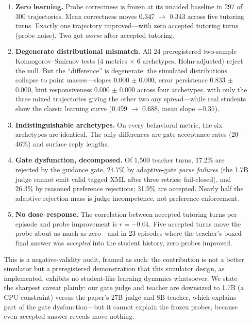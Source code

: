 \documentclass[12pt,a4paper]{article}
\begin{document}
\begin{enumerate}
\item \textbf{Zero learning.} Probe correctness is frozen at its unaided
baseline in 297 of 300 trajectories. Mean correctness moves 0.347
$\rightarrow$ 0.343 across five tutoring turns. Exactly one trajectory
improved---with zero accepted tutoring turns (probe noise). Two got
\emph{worse} after accepted tutoring.
\item \textbf{Degenerate distributional mismatch.} All 24 preregistered
two-sample Kolmogorov--Smirnov tests (4 metrics $\times$ 6 archetypes,
Holm-adjusted) reject the null. But the ``difference'' is degenerate:
the simulated distributions collapse to point masses---slopes $0.000$
$\pm$ 0.000, error persistence $0.833$ $\pm$ 0.000, hint
responsiveness $0.000$ $\pm$ 0.000 across four archetypes, with only the three
mixed trajectories giving the other two any spread---while real students show the
classic learning curve (0.499 $\rightarrow$ 0.688, mean slope $-0.35$).
\item \textbf{Indistinguishable archetypes.} On every behavioral metric, the
six archetypes are identical. The only differences are gate acceptance rates
(20--46\%) and surface reply lengths.
\item \textbf{Gate dysfunction, decomposed.} Of 1{,}500 teacher turns, 17.2\%
are rejected by the guidance gate, 24.7\% by adaptive-gate \emph{parse
failures} (the 1.7B judge cannot emit valid tagged XML after three retries;
fail-closed), and 26.3\% by reasoned preference rejections; 31.9\% are
accepted. Nearly half the adaptive rejection mass is judge incompetence, not
preference enforcement.
\item \textbf{No dose--response.} The correlation between accepted tutoring
turns per episode and probe improvement is $r=-0.04$. Five accepted turns
move the probe about as much as zero---and in 23 episodes where the
teacher's boxed final answer was \emph{accepted} into the student history,
zero probes improved.
\end{enumerate}

This is a negative-validity audit, framed as such: the contribution is not a
better simulator but a preregistered demonstration
that this simulator design, as implemented, exhibits no
student-like learning dynamics whatsoever. We state the sharpest caveat
plainly: our gate judge and teacher are downsized to 1.7B (a CPU constraint)
versus the paper's 27B judge and 8B teacher, which explains part of the gate
dysfunction---but it cannot explain the frozen probes, because even accepted
answer reveals move nothing.
\end{document}
